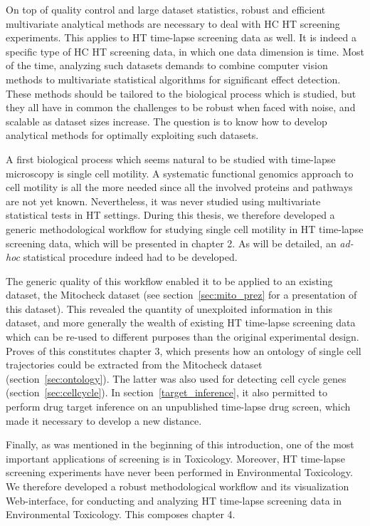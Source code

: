 On top of quality control and large dataset statistics, robust and efficient multivariate analytical methods are necessary to deal with HC HT screening experiments. This applies to HT time-lapse screening data as well. It is indeed a specific type of HC HT screening data, in which one data dimension is time. Most of the time, analyzing such datasets demands to combine computer vision methods to multivariate statistical algorithms for significant effect detection. These methods should be tailored to the biological process which is studied, but they all have in common the challenges to be robust when faced with noise, and scalable as dataset sizes increase. The question is to know how to develop analytical methods for optimally exploiting such datasets.

A first biological process which seems natural to be studied with time-lapse microscopy is single cell motility. A systematic functional genomics approach to cell motility is all the more needed since all the involved proteins and pathways are not yet known. Nevertheless, it was never studied using multivariate statistical tests in HT settings. During this thesis, we therefore developed a generic methodological workflow for studying single cell motility in HT time-lapse screening data, which will be presented in chapter 2. As will be detailed, an \textit{ad-hoc} statistical procedure indeed had to be developed.

The generic quality of this workflow enabled it to be applied to an existing dataset, the Mitocheck dataset (see section~\ref{sec:mito_prez} for a presentation of this dataset). This revealed the quantity of unexploited information in this dataset, and more generally the wealth of existing HT time-lapse screening data which can be re-used to different purposes than the original experimental design. Proves of this constitutes chapter 3, which presents how an ontology of single cell trajectories could be extracted from the Mitocheck dataset (section~\ref{sec:ontology}). The latter was also used for detecting cell cycle genes (section~\ref{sec:cellcycle}). In section~\ref{target_inference}, it also permitted to perform drug target inference on an unpublished time-lapse drug screen, which made it necessary to develop a new distance.

Finally, as was mentioned in the beginning of this introduction, one of the most important applications of screening is in Toxicology. Moreover, HT time-lapse screening experiments have never been performed in Environmental Toxicology. We therefore developed a robust methodological workflow and its visualization Web-interface, for conducting and analyzing HT time-lapse screening data in Environmental Toxicology. This composes chapter 4.

